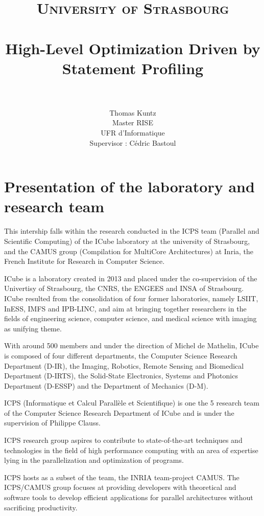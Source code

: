 \documentclass[paper=a4, fontsize=11.5pt]{scrartcl}
\title{
        \usefont{OT1}{bch}{b}{n}
        \normalfont \normalsize \textsc{University of Strasbourg} \\ [25pt]
        \horrule{0.5pt} \\[0.4cm]
        \huge High-Level Optimization Driven by Statement Profiling \\
        \horrule{2pt} \\[0.5cm]
}
\author{
        \normalfont                                 \Large
        Thomas Kuntz \\                                \normalsize
        Master RISE \\                                \normalsize
        UFR d'Informatique \\                                \normalsize
        Supervisor : Cédric Bastoul\\
}
\date{}
\numberwithin{equation}{section}        %
\numberwithin{figure}{section}          %
\numberwithin{table}{section}               %
\begin{document}

\maketitle
\thispagestyle{empty}

\clearpage

\tableofcontents
\clearpage

\section{Presentation of the laboratory and research team}
This intership falls within the research conducted in the ICPS team (Parallel and Scientific
Computing) of the ICube laboratory at the university of Strasbourg, and the CAMUS group
(Compilation for MultiCore Architectures) at Inria, the French Institute for Research
in Computer Science.

ICube is a laboratory created in 2013 and placed under the co-supervision of the Univertisy of
Strasbourg, the CNRS, the ENGEES and INSA of Strasbourg.
ICube resulted from the consolidation of four former laboratories, namely LSIIT, InESS, IMFS and IPB-LINC,
and aim at bringing together researchers in the fields of engineering science, computer science,
and medical science with imaging as unifying theme.

With around 500 members and under the direction of Michel de Mathelin, ICube is composed of
four different departments, the Computer Science Research Department (D-IR), the
Imaging, Robotics, Remote Sensing and Biomedical Department (D-IRTS), the 
Solid-State Electronics, Systems and Photonics Department (D-ESSP) and the 
Department of Mechanics (D-M).

ICPS (Informatique et Calcul Parallèle et Scientifique)
is one the 5 research team of the Computer Science Research Department of ICube and is
under the supervision of Philippe Clauss.

ICPS research group aspires to contribute to state-of-the-art techniques and
technologies in the field of high performance computing with an area of expertise lying
in the parallelization and optimization of programs.

ICPS hosts as a subset of the team, the INRIA team-project CAMUS.
The ICPS/CAMUS group focuses at providing developers with theoretical and software
tools to develop efficient applications for parallel architectures without sacrificing
productivity.
\end{document}
